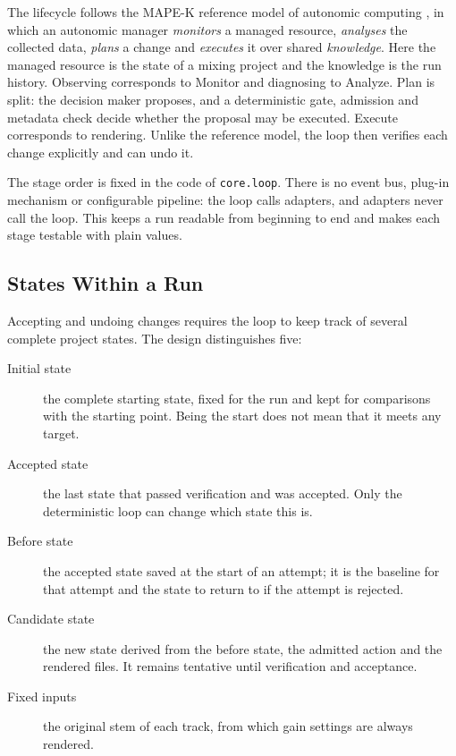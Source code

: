 The lifecycle follows the \ac{MAPE-K} reference model of autonomic computing \cite{Kephart2003}, in which an autonomic manager \emph{monitors} a managed resource, \emph{analyses} the collected data, \emph{plans} a change and \emph{executes} it over shared \emph{knowledge}. Here the managed resource is the state of a mixing project and the knowledge is the run history. Observing corresponds to Monitor and diagnosing to Analyze. Plan is split: the decision maker proposes, and a deterministic gate, admission and metadata check decide whether the proposal may be executed. Execute corresponds to rendering. Unlike the reference model, the loop then verifies each change explicitly and can undo it.

The stage order is fixed in the code of \texttt{core.loop}. There is no event bus, plug-in mechanism or configurable pipeline: the loop calls adapters, and adapters never call the loop. This keeps a run readable from beginning to end and makes each stage testable with plain values.

\subsection{States Within a Run}
\label{sec:arch-states}

Accepting and undoing changes requires the loop to keep track of several complete project states. The design distinguishes five:

\begin{description}
	\item[Initial state] the complete starting state, fixed for the run and kept for comparisons with the starting point. Being the start does not mean that it meets any target.
	\item[Accepted state] the last state that passed verification and was accepted. Only the deterministic loop can change which state this is.
	\item[Before state] the accepted state saved at the start of an attempt; it is the baseline for that attempt and the state to return to if the attempt is rejected.
	\item[Candidate state] the new state derived from the before state, the admitted action and the rendered files. It remains tentative until verification and acceptance.
	\item[Fixed inputs] the original stem of each track, from which gain settings are always rendered.
\end{description}


